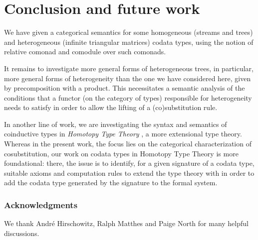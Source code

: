\documentclass[a4paper,USenglish]{lipics}
\begin{document}
\begin{Long}
\begin{comment}
The codata types specified via this \coq mechanism are stronger than those given by the axioms we consider.
More precisely, we prove the axioms of \Cref{tri_rules} from the above declaration of \lstinline!CoInductive Tri! and
\lstinline!CoInductive bisim!, and similar for streams.


This might be the right moment to point to work on a device allowing the declaration of coinductive types via destructors in \agda, 
see \parencite{DBLP:conf/popl/AbelPTS13}.
\end{comment}

\end{Long}

\section{Conclusion and future work}

We have given a categorical semantics for some homogeneous (streams and trees) and heterogeneous (infinite triangular matrices) codata types,
using the notion of relative comonad and comodule over such comonads.

It remains to investigate more general forms of heterogeneous trees, in particular, more general forms of heterogeneity than the one we have
considered here, given by precomposition with a product.
This necessitates a semantic analysis of the conditions that a functor (on the category of types) responsible for heterogeneity needs to satisfy in order to allow the lifting of a (co)substitution rule.

In another line of work, we are investigating the syntax and semantics of coinductive types in \emph{Homotopy Type Theory} \parencite{hottbook},
a more extensional type theory.
Whereas in the present work, the focus lies on the categorical characterization of cosubstitution, our work on codata types in Homotopy Type Theory is more foundational:
there, the issue is to identify, for a given signature of a codata type, suitable axioms and computation rules to extend the type theory with in order to 
add the  codata type generated by the signature to the formal system.

 

\begin{Long}
 
\subsubsection*{Acknowledgments}
 We thank André Hirschowitz, Ralph Matthes and Paige North for many helpful discussions.

\end{Long}
 
\printbibliography



% 
% 
% 
\end{document}
